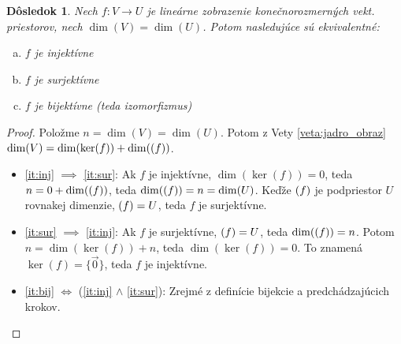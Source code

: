 \documentclass[11pt,a4paper]{article}
\theoremstyle{definition}
\theoremstyle{plain}
\newtheorem{dosledok}[definicia]{Dôsledok}
\theoremstyle{remark}
\let\Im\relax
\DeclareMathOperator{\Im}{Im}
\begin{document}
\begin{dosledok} \label{dosl:ekvivalencia}
Nech $f: V \to U$ je lineárne zobrazenie konečnorozmerných vekt. priestorov, nech $\dim(V) = \dim(U)$. Potom nasledujúce sú ekvivalentné:
\begin{enumerate}[a)]
    \item $f$ je injektívne \label{it:inj}
    \item $f$ je surjektívne \label{it:sur}
    \item $f$ je bijektívne (teda izomorfizmus) \label{it:bij}
\end{enumerate}
\end{dosledok}

\begin{proof}
Položme $n = \dim(V) = \dim(U)$. Potom z Vety \ref{veta:jadro_obraz} $\dim(V) = \dim(\ker(f)) + \dim(\Im(f))$.
\begin{itemize}
    \item \ref{it:inj} $\implies$ \ref{it:sur}: Ak $f$ je injektívne, $\dim(\ker(f)) = 0$, teda $n = 0 + \dim(\Im(f))$, teda $\dim(\Im(f)) = n = \dim(U)$. Keďže $\Im(f)$ je podpriestor $U$ rovnakej dimenzie, $\Im(f) = U$, teda $f$ je surjektívne.
    \item \ref{it:sur} $\implies$ \ref{it:inj}: Ak $f$ je surjektívne, $\Im(f) = U$, teda $\dim(\Im(f)) = n$. Potom $n = \dim(\ker(f)) + n$, teda $\dim(\ker(f)) = 0$. To znamená $\ker(f) = \{ \vec{0} \}$, teda $f$ je injektívne.
    \item \ref{it:bij} $\iff$ (\ref{it:inj} $\land$ \ref{it:sur}): Zrejmé z definície bijekcie a predchádzajúcich krokov.
\end{itemize}
\end{proof}
\end{document}
